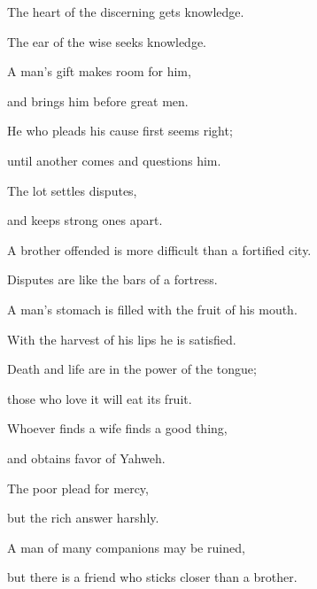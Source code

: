 {\par }{\Q {}The heart of the discerning gets knowledge.
\par }{\QB The ear of the wise seeks knowledge.
\par }{\Q {}A man’s gift makes room for him,
\par }{\QB and brings him before great men.
\par }{\Q {}He who pleads his cause first seems right;
\par }{\QB until another comes and questions him.
\par }{\Q {}The lot settles disputes,
\par }{\QB and keeps strong ones apart.
\par }{\Q {}A brother offended is more difficult than a fortified city.
\par }{\QB Disputes are like the bars of a fortress.
\par }{\Q {}A man’s stomach is filled with the fruit of his mouth.
\par }{\QB With the harvest of his lips he is satisfied.
\par }{\Q {}Death and life are in the power of the tongue;
\par }{\QB those who love it will eat its fruit.
\par }{\Q {}Whoever finds a wife finds a good thing,
\par }{\QB and obtains favor of Yahweh.
\par }{\Q {}The poor plead for mercy,
\par }{\QB but the rich answer harshly.
\par }{\Q {}A man of many companions may be ruined,
\par }{\QB but there is a friend who sticks closer than a brother.

}
